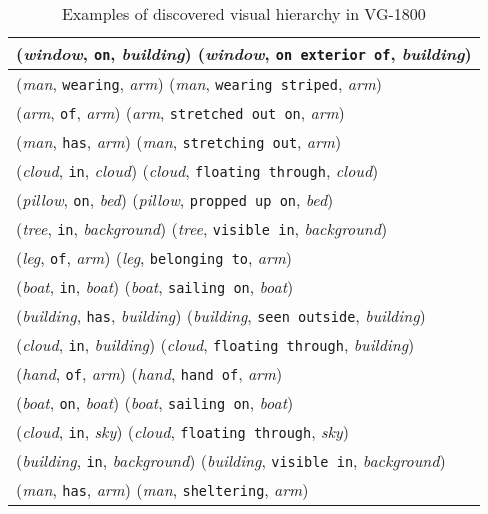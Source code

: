 \documentclass[runningheads]{llncs}
\begin{document}
{
\begin{longtable}{ l }
\caption{Examples of discovered visual hierarchy in VG-1800}
\label{table:vg1800_vis_h}\\
\hline
(\textit{window}, \texttt{on}, \textit{building})  (\textit{window}, \texttt{on exterior of}, \textit{building}) \\ \hline
(\textit{man}, \texttt{wearing}, \textit{arm})  (\textit{man}, \texttt{wearing striped}, \textit{arm}) \\ \hline
(\textit{arm}, \texttt{of}, \textit{arm})  (\textit{arm}, \texttt{stretched out on}, \textit{arm}) \\ \hline
(\textit{man}, \texttt{has}, \textit{arm})  (\textit{man}, \texttt{stretching out}, \textit{arm}) \\ \hline
(\textit{cloud}, \texttt{in}, \textit{cloud})  (\textit{cloud}, \texttt{floating through}, \textit{cloud}) \\ \hline
(\textit{pillow}, \texttt{on}, \textit{bed})  (\textit{pillow}, \texttt{propped up on}, \textit{bed}) \\ \hline
(\textit{tree}, \texttt{in}, \textit{background})  (\textit{tree}, \texttt{visible in}, \textit{background}) \\ \hline
(\textit{leg}, \texttt{of}, \textit{arm})  (\textit{leg}, \texttt{belonging to}, \textit{arm}) \\ \hline
(\textit{boat}, \texttt{in}, \textit{boat})  (\textit{boat}, \texttt{sailing on}, \textit{boat}) \\ \hline
(\textit{building}, \texttt{has}, \textit{building})  (\textit{building}, \texttt{seen outside}, \textit{building}) \\ \hline
(\textit{cloud}, \texttt{in}, \textit{building})  (\textit{cloud}, \texttt{floating through}, \textit{building}) \\ \hline
(\textit{hand}, \texttt{of}, \textit{arm})  (\textit{hand}, \texttt{hand of}, \textit{arm}) \\ \hline
(\textit{boat}, \texttt{on}, \textit{boat})  (\textit{boat}, \texttt{sailing on}, \textit{boat}) \\ \hline
(\textit{cloud}, \texttt{in}, \textit{sky})  (\textit{cloud}, \texttt{floating through}, \textit{sky}) \\ \hline
(\textit{building}, \texttt{in}, \textit{background})  (\textit{building}, \texttt{visible in}, \textit{background}) \\ \hline
(\textit{man}, \texttt{has}, \textit{arm})  (\textit{man}, \texttt{sheltering}, \textit{arm}) \\ \hline

\end{longtable}}
\end{document}
